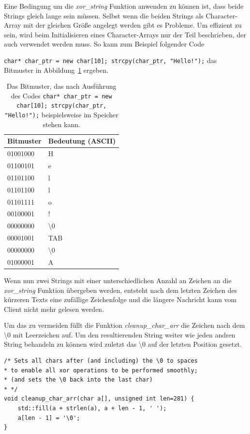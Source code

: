 \documentclass[]{article}
\begin{document}
Eine Bedingung um die \textit{xor\_string} Funktion anwenden zu können ist, dass beide Strings gleich lange sein müssen. Selbst wenn die beiden Strings als Character-Array mit der gleichen Größe angelegt werden gibt es Probleme. Um effizient zu sein, wird beim Initialisieren eines Character-Arrays nur der Teil beschrieben, der auch verwendet werden muss. So kann zum Beispiel folgender Code

\noindent
\lstinline|char* char_ptr = new char[10]; strcpy(char_ptr, "Hello!");| das Bitmuster in Abbildung~\ref{fig:bitcode_char_array} ergeben.

\begin{table}[]
	\centering
	\begin{tabular}{l|l}
		Bitmuster  & Bedeutung (ASCII)\\ \hline
		01001000   & H                \\
		01100101   & e                \\
		01101100   & l                \\
		01101100   & l                \\
		01101111   & o                \\
		00100001   & !                \\
		00000000   & \textbackslash 0 \\
		00001001   & TAB              \\
		00000000   & \textbackslash 0 \\		
		01000001   & A                \\		
	\end{tabular}
	\caption{Das Bitmuster, das nach Ausführung des Codes \lstinline|char* char_ptr = new char[10]; strcpy(char_ptr, "Hello!");| beispielsweise im Speicher stehen kann.}
	\label{fig:bitcode_char_array}
\end{table}

Wenn nun zwei Strings mit einer unterschiedlichen Anzahl an Zeichen an die \textit{xor\_string} Funktion übergeben werden, entsteht nach dem letzten Zeichen des kürzeren Texts eine zufällige Zeichenfolge und die längere Nachricht kann vom Client nicht mehr gelesen werden.

Um das zu vermeiden füllt die Funktion \textit{cleanup\_char\_arr} die Zeichen nach dem \textbackslash 0 mit Leerzeichen auf. Um den resultierenden String weiter wie jeden andren String behandeln zu können wird zuletzt das \textbackslash 0 auf der letzten Position gesetzt.

\begin{lstlisting}
/* Sets all chars after (and including) the \0 to spaces
* to enable all xor operations to be performed smoothly;
* (and sets the \0 back into the last char)
* */
void cleanup_char_arr(char a[], unsigned int len=281) {
	std::fill(a + strlen(a), a + len - 1, ' ');
	a[len - 1] = '\0';
}
\end{lstlisting}
\end{document}
